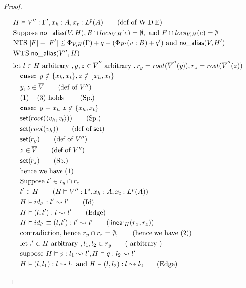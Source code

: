 \documentclass[11pt]{article}
\newcommand{\ms}[1]{\ensuremath{\mathsf{#1}}}
\newcommand{\na}[2]{\mathsf{no\_alias}(#1,#2)}
\begin{document}
\begin{proof}
\begin{description}
\begin{align*}
  &H \vDash V'' : \Gamma', x_h : A, x_t : L^p(A) \tag{def of W.D.E}\\
  &\text{Suppose }  \na{V}{H}, R \cap locs_{V,H}(e) = \emptyset, \text{ and } F \cap locs_{V,H}(e) = \emptyset\\
  &\text{NTS }  |F| - |F'| \le \Phi_{V,H}(\Gamma) +q - (\Phi_{H'}(v:B) + q') \text{ and } \na{V}{H'}\\
  &\text{WTS } \na{V''}{H}\\
  &\text{let } l \in H \text{ arbitrary }, y, z \in \overline V'' \text{ arbitrary },  r_y = root(\overline V''(y)), r_z = root(\overline V''(z))\\
  &\quad\textbf{case: } y \notin \{x_h,x_t\}, z \notin \{x_h,x_t\}\\
  &\quad y,z \in \overline V \tag{def of $V''$}\\
  &\quad (1) - (3) \text{ holds } \tag{Sp.}\\
  &\quad\textbf{case: } y = x_h, z \notin \{x_h,x_t\}\\
  &\quad \ms{set}(root(\pairexcst{v_h}{v_t})) \tag{Sp.}\\
  &\quad \ms{set}(root(v_h)) \tag{def of $\ms{set}$}\\
  &\quad \ms{set}(r_y) \tag{def of $V''$}\\
  &\quad z \in \overline V \tag{def of $V''$}\\
  &\quad \ms{set}(r_z) \tag{Sp.}\\
  &\quad \text{hence we have (1)}\\
  &\quad \text{Suppose } l' \in r_y \cap r_z\\
  &\quad l' \in H \tag{$H \vDash V'' :  \Gamma', x_h : A, x_t : L^p(A)$}\\
  &\quad H \vDash id_{l'} : l' \leadsto l' \tag{Id}\\
  &\quad H \vDash (l,l') : l \leadsto l' \tag{Edge}\\
  &\quad H \vDash id_{l'} \equiv (l,l') : l' \leadsto l' \tag{$\ms{linear}_H(r_x,r_z)$}\\
  &\quad \text{contradiction, hence } r_y \cap r_z = \emptyset,  \tag{hence we have (2)}\\
  &\quad \text{let } l' \in H \text{ arbitrary }, l_1,l_2 \in r_y \tag{ arbitrary }\\
  &\quad \text{suppose } H \vDash p : l_1 \leadsto l', H \vDash q : l_2 \leadsto l'\\
  &\quad H \vDash (l,l_1) : l \leadsto l_1 \text{ and }  H \vDash (l,l_2) : l \leadsto l_2 \tag{Edge}\\

\end{align*}
\end{description}
\end{proof}
\end{document}
